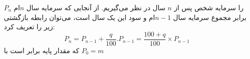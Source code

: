 \p
    $P_n$
    را سرمایه شخص پس از 
    $n$
    سال در نظر می‌گیریم.
    از آنجایی که سرمایه سال
    $n$ام
    برابر مجموع سرمایه
    سال
    $n-1$ام
    و سود این یک سال است،
    می‌توان رابطه بازگشتی زیر را تعریف کرد:
    $$ P_n = P_{n-1} + \frac{q}{100}.P_{n-1} = \frac{100+q}{100} \times P_{n-1} $$
    که مقدار پایه برابر است با
    $P_0 = m $


